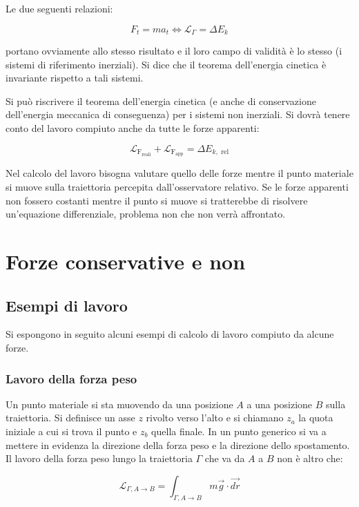 Le due seguenti relazioni:

\[
	\boxed{F_t=ma_t \iff \mathcal{L}_\Gamma=\Delta E_k}
\]

portano ovviamente allo stesso risultato e il loro campo di validità è lo stesso (i sistemi di riferimento inerziali). Si dice che il teorema dell'energia cinetica è invariante rispetto a tali sistemi.

Si può riscrivere il teorema dell'energia cinetica (e anche di conservazione dell'energia meccanica di conseguenza) per i sistemi non inerziali. Si dovrà tenere conto del lavoro compiuto anche da tutte le forze apparenti:

\[
	\mathcal{L}_{\text{F}_{\text{reali}}}+\mathcal{L}_{\text{F}_{\text{app}}}=\Delta E_{k, \text{ rel}}
\]

Nel calcolo del lavoro bisogna valutare quello delle forze mentre il punto materiale si muove sulla traiettoria percepita dall'osservatore relativo. Se le forze apparenti non fossero costanti mentre il punto si muove si tratterebbe di risolvere un'equazione differenziale, problema non che non verrà affrontato.

\section{Forze conservative e non}

\subsection{Esempi di lavoro}

Si espongono in seguito alcuni esempi di calcolo di lavoro compiuto da alcune forze.

\subsubsection{Lavoro della forza peso}

Un punto materiale si sta muovendo da una posizione $A$ a una posizione $B$ sulla traiettoria. Si definisce un asse $z$ rivolto verso l'alto e si chiamano $z_a$ la quota iniziale a cui si trova il punto e $z_b$ quella finale. In un punto generico si va a mettere in evidenza la direzione della forza peso e la direzione dello spostamento. Il lavoro della forza peso lungo la traiettoria $\Gamma$ che va da $A$ a $B$ non è altro che:

\[
	\mathcal{L}_{\Gamma, A \to B}=\int_{\Gamma, A \to B} m\vec{g} \cdot \vec{dr}
\]

